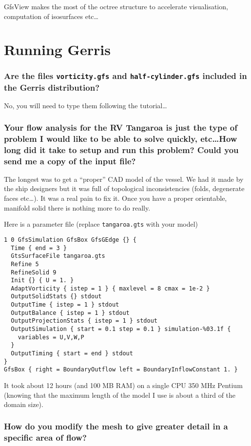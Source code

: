 \documentclass[a4paper]{article}
\begin{document}
GfsView makes the most of the octree structure to accelerate
visualisation, computation of isosurfaces etc\dots

\section{Running Gerris}

\subsubsection{Are the files {\tt vorticity.gfs} and {\tt half-cylinder.gfs} included in the 
Gerris distribution?}

No, you will need to type them following the tutorial\dots

\subsubsection{Your flow analysis for the RV Tangaroa is just the type of problem I would 
like to be able to solve quickly, etc\dots  How long did it take to setup and run 
this problem?  Could you send me a copy of the input file?}

The longest was to get a ``proper'' CAD model of the vessel. We had it
made by the ship designers but it was full of topological
inconsistencies (folds, degenerate faces etc\dots). It was a real pain
to fix it. Once you have a proper orientable, manifold solid there is
nothing more to do really.

Here is a parameter file (replace {\tt tangaroa.gts} with your model)
\begin{verbatim}
1 0 GfsSimulation GfsBox GfsGEdge {} {
  Time { end = 3 }
  GtsSurfaceFile tangaroa.gts
  Refine 5
  RefineSolid 9
  Init {} { U = 1. }
  AdaptVorticity { istep = 1 } { maxlevel = 8 cmax = 1e-2 }
  OutputSolidStats {} stdout
  OutputTime { istep = 1 } stdout
  OutputBalance { istep = 1 } stdout
  OutputProjectionStats { istep = 1 } stdout
  OutputSimulation { start = 0.1 step = 0.1 } simulation-%03.1f {
	variables = U,V,W,P 
  }
  OutputTiming { start = end } stdout
}
GfsBox { right = BoundaryOutflow left = BoundaryInflowConstant 1. }
\end{verbatim}
It took about 12 hours (and 100 MB RAM) on a single CPU 350 MHz
Pentium (knowing that the maximum length of the model I use is about a
third of the domain size).

\subsubsection{How do you modify the mesh to give greater detail in
a specific area of flow?}
\end{document}
